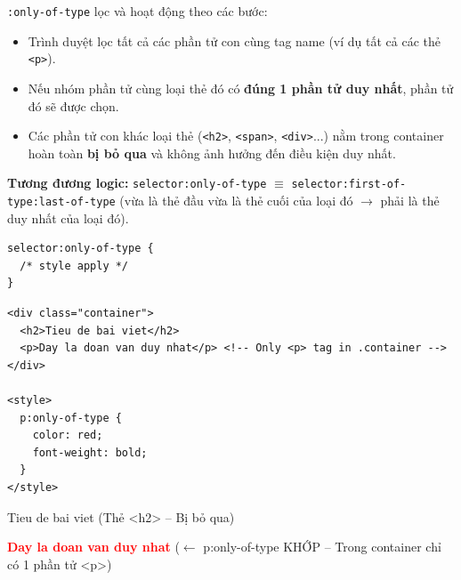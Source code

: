\documentclass[11pt,oneside]{book}
\newcommand{\codeinline}[1]{\textcolor{accentOrange}{\texttt{#1}}}
\begin{document}
\begin{conceptBox}
\codeinline{:only-of-type} lọc và hoạt động theo các bước:
\begin{itemize}[leftmargin=1.5em, itemsep=2pt, parsep=0pt]
    \item Trình duyệt lọc tất cả các phần tử con cùng tag name (ví dụ tất cả các thẻ \codeinline{<p>}).
    \item Nếu nhóm phần tử cùng loại thẻ đó có \textbf{đúng 1 phần tử duy nhất}, phần tử đó sẽ được chọn.
    \item Các phần tử con khác loại thẻ (\codeinline{<h2>}, \codeinline{<span>}, \codeinline{<div>}...) nằm trong container hoàn toàn \textbf{bị bỏ qua} và không ảnh hưởng đến điều kiện duy nhất.
\end{itemize}
\par\vspace{4pt}
\textbf{Tương đương logic:} \codeinline{selector:only-of-type} $\equiv$ \codeinline{selector:first-of-type:last-of-type} (vừa là thẻ đầu vừa là thẻ cuối của loại đó $\rightarrow$ phải là thẻ duy nhất của loại đó).
\end{conceptBox}

\begin{codeWindow}
\begin{lstlisting}[language=CSS3]
selector:only-of-type {
  /* style apply */
}
\end{lstlisting}
\end{codeWindow}

\begin{codeWindow}
\begin{lstlisting}[language=HTML5]
<div class="container">
  <h2>Tieu de bai viet</h2>
  <p>Day la doan van duy nhat</p> <!-- Only <p> tag in .container -->
</div>

<style>
  p:only-of-type {
    color: red;
    font-weight: bold;
  }
</style>
\end{lstlisting}
\end{codeWindow}

\begin{browserWindow}
\sffamily\small
Tieu de bai viet {\scriptsize\textcolor{gray!60}{(Thẻ <h2> -- Bị bỏ qua)}} \par\vspace{2pt}
\textcolor{red}{\textbf{Day la doan van duy nhat}} {\scriptsize\textcolor{gray!60}{($\leftarrow$ p:only-of-type KHỚP -- Trong container chỉ có 1 phần tử <p>)}}
\end{browserWindow}
\end{document}
